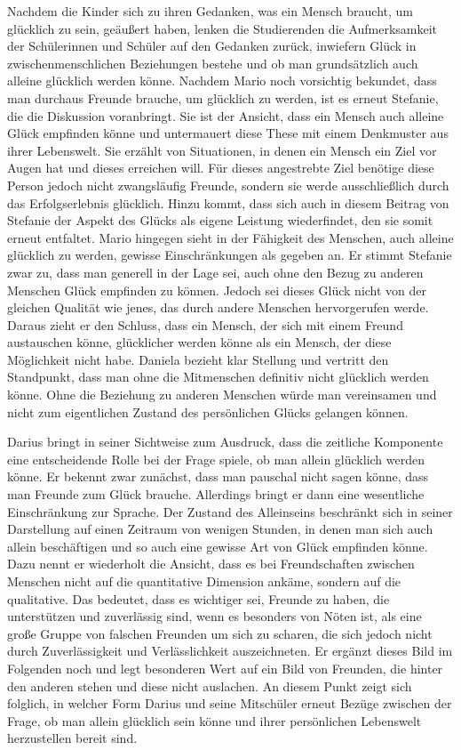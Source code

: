 Nachdem die Kinder sich zu ihren Gedanken, was ein Mensch braucht, um glücklich zu sein, geäußert haben, lenken die Studierenden die Aufmerksamkeit der Schülerinnen und Schüler auf den Gedanken zurück, inwiefern Glück in zwischenmenschlichen Beziehungen bestehe und ob man grundsätzlich auch alleine glücklich werden könne. 
Nachdem Mario noch vorsichtig bekundet, dass man durchaus Freunde brauche, um glücklich zu werden, ist es erneut Stefanie, die die Diskussion voranbringt. 
Sie ist der Ansicht, dass ein Mensch auch alleine Glück empfinden könne und untermauert diese These mit einem Denkmuster aus ihrer Lebenswelt. 
Sie erzählt von Situationen, in denen ein Mensch ein Ziel vor Augen hat und dieses erreichen will. 
Für dieses angestrebte Ziel benötige diese Person jedoch nicht zwangsläufig Freunde, sondern sie werde ausschließlich durch das Erfolgserlebnis glücklich. 
Hinzu kommt, dass sich auch in diesem Beitrag von Stefanie der Aspekt des Glücks als eigene Leistung wiederfindet, den sie somit erneut entfaltet.
Mario hingegen sieht in der Fähigkeit des Menschen, auch alleine glücklich zu werden, gewisse Einschränkungen als gegeben an. 
Er stimmt Stefanie zwar zu, dass man generell in der Lage sei, auch ohne den Bezug zu anderen Menschen Glück empfinden zu können. 
Jedoch sei dieses Glück nicht von der gleichen Qualität wie jenes, das durch andere Menschen hervorgerufen werde. 
Daraus zieht er den Schluss, dass ein Mensch, der sich mit einem Freund austauschen könne, glücklicher werden könne als ein Mensch, der diese Möglichkeit nicht habe. 
Daniela bezieht klar Stellung und vertritt den Standpunkt, dass man ohne die Mitmenschen definitiv nicht glücklich werden könne. 
Ohne die Beziehung zu anderen Menschen würde man vereinsamen und nicht zum eigentlichen Zustand des persönlichen Glücks gelangen können.

Darius bringt in seiner Sichtweise zum Ausdruck, dass die zeitliche Komponente eine entscheidende Rolle bei der Frage spiele, ob man allein glücklich werden könne. 
Er bekennt zwar zunächst, dass man pauschal nicht sagen könne, dass man Freunde zum Glück brauche. 
Allerdings bringt er dann eine wesentliche Einschränkung zur Sprache. 
Der Zustand des Alleinseins beschränkt sich in seiner Darstellung auf einen Zeitraum von wenigen Stunden, in denen man sich auch allein beschäftigen und so auch eine gewisse Art von Glück empfinden könne. 
Dazu nennt er wiederholt die Ansicht, dass es bei Freundschaften zwischen Menschen nicht auf die quantitative Dimension ankäme, sondern auf die qualitative. 
Das bedeutet, dass es wichtiger sei, Freunde zu haben, die unterstützen und zuverlässig sind, wenn es besonders von Nöten ist, als eine große Gruppe von falschen Freunden um sich zu scharen, die sich jedoch nicht durch Zuverlässigkeit und Verlässlichkeit auszeichneten. 
Er ergänzt dieses Bild im Folgenden noch und legt besonderen Wert auf ein Bild von Freunden, die hinter den anderen stehen und diese nicht auslachen. 
An diesem Punkt zeigt sich folglich, in welcher Form Darius und seine Mitschüler erneut Bezüge zwischen der Frage, ob man allein glücklich sein könne und ihrer persönlichen Lebenswelt herzustellen bereit sind.

